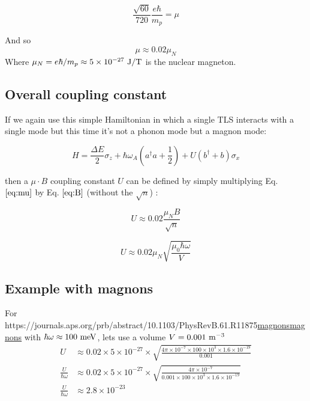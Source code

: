 \documentclass[
]{article}
\let\oldhref\href
\renewcommand{\href}[2]{\ifx#1\urlprefix\oldhref{#1}{#2}\else\uline{\oldhref{#1}{#2}}\fi}
\renewcommand{\[}{\begin{equation}}
\renewcommand{\]}{\end{equation}}
\begin{document}
\[
\frac{\sqrt{60}}{720} \frac{e\hbar}{m_p} = \mu
\]

And so \[
\mu \approx 0.02 \mu_N
\label{eq:mu}
\] Where \(\mu_N = e\hbar/m_p \approx 5\times 10^{-27} \ \rm J/T\) is
the nuclear magneton.

\subsection{Overall coupling
constant}\label{overall-coupling-constant-2}

If we again use this simple Hamiltonian in which a single TLS interacts
with a single mode but this time it's not a phonon mode but a magnon
mode:

\[
H = \frac{\Delta E}{2} \sigma_z + \hbar\omega_A\left(a^{\dagger}a +\frac{1}{2}\right) + U\left( b^{\dagger} + b \right)\sigma_x
\]

then a \(\mu \cdot B\) coupling constant \(U\) can be defined by simply
multiplying Eq. \(\ref{eq:mu}\) by Eq. \(\ref{eq:B}\) (without the
\(\sqrt{n}\)) :

\[
U \approx 0.02 \frac{{\mu_N}B}{\sqrt{n}}
\]

\[
U \approx 0.02 {\mu_N}\sqrt{\frac{\mu_0\hbar\omega}{V}}
\]

\subsection{Example with magnons}\label{example-with-magnons}

For
\href{https://journals.aps.org/prb/abstract/10.1103/PhysRevB.61.R11875}{magnons}
with \(\hbar \omega \approx 100 \ \rm meV\), lets use a volume
\(V = 0.001 \ \rm m^{-3}\) \[
\begin{aligned}
U &\approx 0.02 \times 5\times 10^{-27}\times \sqrt{\frac{4\pi\times 10^{-7}\times 100\times 10^{3}\times 1.6\times 10^{-19}}{0.001}} \\
\frac{U}{\hbar\omega} &\approx 0.02 \times 5\times 10^{-27}\times\sqrt{\frac{4\pi\times 10^{-7} }{0.001 \times 100\times 10^{3}\times 1.6\times 10^{-19}}} \\
\frac{U}{\hbar\omega} &\approx 2.8\times10^{-23}
\end{aligned}
\]

\printbibliography
\end{document}
